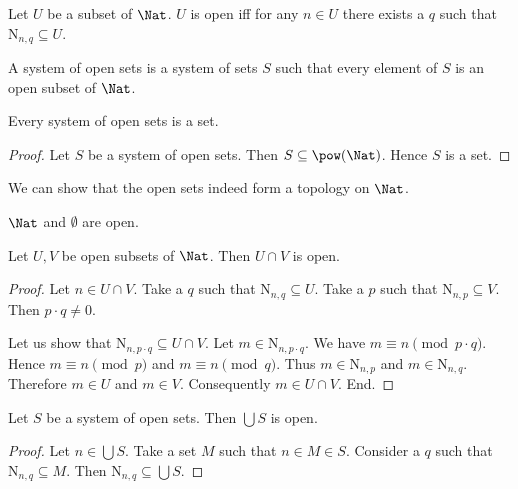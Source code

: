 \documentclass{article}
\newcommand{\N}{\mathrm{N}}
\begin{document}
  \begin{forthel}
    \begin{definition}
      Let $U$ be a subset of $\Nat$.
      $U$ is open iff for any $n \in U$ there exists a $q$ such that
      $\N_{n, q} \subseteq U$.
    \end{definition}

    \begin{definition}
      A system of open sets is a system of sets $S$ such that every element of
      $S$ is an open subset of $\Nat$.
    \end{definition}

    \begin{lemma}
      Every system of open sets is a set.
    \end{lemma}
    \begin{proof}
      Let $S$ be a system of open sets.
      Then $S \subseteq \pow(\Nat)$.
      Hence $S$ is a set.
    \end{proof}
  \end{forthel}

  We can show that the open sets indeed form a topology on $\Nat$.

  \begin{forthel}
    \begin{lemma}
      $\Nat$ and $\emptyset$ are open.
    \end{lemma}

    \begin{lemma}
      Let $U,V$ be open subsets of $\Nat$.
      Then $U \cap V$ is open.
    \end{lemma}
    \begin{proof}
      Let $n \in U \cap V$.
      Take a $q$ such that $\N_{n, q} \subseteq U$.
      Take a $p$ such that $\N_{n, p} \subseteq V$.
      Then $p \cdot q \neq 0$.

      Let us show that $\N_{n, p \cdot q} \subseteq U \cap V$.
        Let $m \in \N_{n, p \cdot q}$.
        We have $m \equiv n \pmod{p \cdot q}$.
        Hence $m \equiv n \pmod{p}$ and $m \equiv n \pmod{q}$.
        Thus $m \in \N_{n, p}$ and $m \in \N_{n, q}$.
        Therefore $m \in U$ and $m \in V$.
        Consequently $m \in U \cap V$.
      End.
    \end{proof}

    \begin{lemma}
      Let $S$ be a system of open sets.
      Then $\bigcup S$ is open.
    \end{lemma}
    \begin{proof}
      Let $n \in \bigcup S$.
      Take a set $M$ such that $n \in M \in S$.
      Consider a $q$ such that $\N_{n, q} \subseteq M$.
      Then $\N_{n, q} \subseteq \bigcup S$.
    \end{proof}
  \end{forthel}
\end{document}
